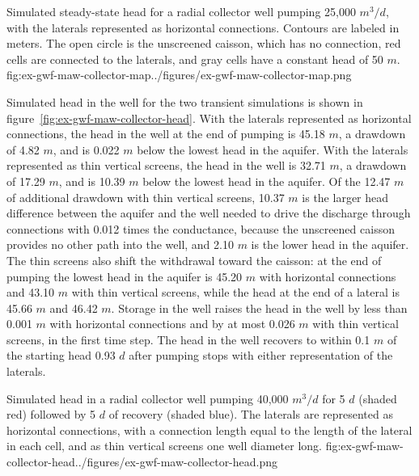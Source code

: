 \begin{StandardFigure}{
    Simulated steady-state head for a radial collector well pumping 25,000 $m^3/d$, with the laterals represented as horizontal connections. Contours are labeled in meters. The open circle is the unscreened caisson, which has no connection, red cells are connected to the laterals, and gray cells have a constant head of 50 $m$.
    }{fig:ex-gwf-maw-collector-map}{../figures/ex-gwf-maw-collector-map.png}
\end{StandardFigure}

Simulated head in the well for the two transient simulations is shown in figure~\ref{fig:ex-gwf-maw-collector-head}. With the laterals represented as horizontal connections, the head in the well at the end of pumping is 45.18 $m$, a drawdown of 4.82 $m$, and is 0.022 $m$ below the lowest head in the aquifer. With the laterals represented as thin vertical screens, the head in the well is 32.71 $m$, a drawdown of 17.29 $m$, and is 10.39 $m$ below the lowest head in the aquifer. Of the 12.47 $m$ of additional drawdown with thin vertical screens, 10.37 $m$ is the larger head difference between the aquifer and the well needed to drive the discharge through connections with 0.012 times the conductance, because the unscreened caisson provides no other path into the well, and 2.10 $m$ is the lower head in the aquifer. The thin screens also shift the withdrawal toward the caisson: at the end of pumping the lowest head in the aquifer is 45.20 $m$ with horizontal connections and 43.10 $m$ with thin vertical screens, while the head at the end of a lateral is 45.66 $m$ and 46.42 $m$. Storage in the well raises the head in the well by less than 0.001 $m$ with horizontal connections and by at most 0.026 $m$ with thin vertical screens, in the first time step. The head in the well recovers to within 0.1 $m$ of the starting head 0.93 $d$ after pumping stops with either representation of the laterals.

\begin{StandardFigure}{
    Simulated head in a radial collector well pumping 40,000 $m^3/d$ for 5 $d$ (shaded red) followed by 5 $d$ of recovery (shaded blue). The laterals are represented as horizontal connections, with a connection length equal to the length of the lateral in each cell, and as thin vertical screens one well diameter long.
    }{fig:ex-gwf-maw-collector-head}{../figures/ex-gwf-maw-collector-head.png}
\end{StandardFigure}
